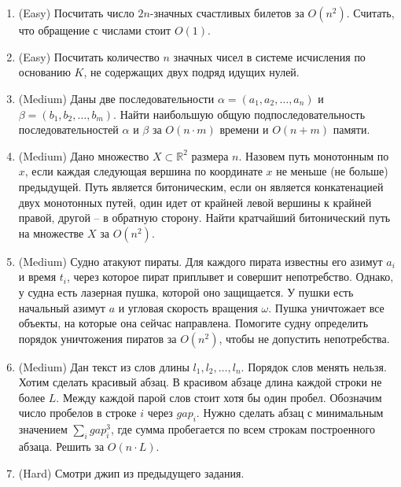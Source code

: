 \section{}

\begin{enumerate}

  \item (Easy) Посчитать число $2n$-значных счастливых билетов за $O(n^2)$.
  Считать, что обращение с числами стоит $O(1)$.

  \item (Easy) Посчитать количество $n$ значных чисел в системе исчисления
  по основанию $K$, не содержащих двух подряд идущих нулей.

  \item (Medium) Даны две последовательности $\alpha = (a_1, a_2, \dots, a_n)$ 
  и $\beta = (b_1, b_2, \dots, b_m)$. Найти наибольшую общую подпоследовательность
  последовательностей $\alpha$ и $\beta$ за $O(n \cdot m)$ времени и $O(n + m)$ 
  памяти.

  \item (Medium) Дано множество $X \subset \mathbb{R}^2$ размера $n$.
  Назовем путь монотонным по $x$, если каждая следующая вершина 
  по координате $x$ не меньше (не больше) предыдущей. Путь является битоническим,
  если он является конкатенацией двух монотонных путей, один идет от крайней левой 
  вершины к крайней правой, другой -- в обратную сторону. Найти кратчайший 
  битонический путь на множестве $X$ за $O(n^2)$.

  \item (Medium) Судно атакуют пираты. Для каждого пирата известны
  его азимут $a_i$ и время $t_i$, через которое пират приплывет и
  совершит непотребство. Однако, у судна есть лазерная пушка, которой 
  оно защищается. У пушки есть начальный азимут $a$ и угловая скорость
  вращения $\omega$. Пушка уничтожает все объекты, на которые она сейчас
  направлена. Помогите судну определить порядок уничтожения пиратов за $O(n^2)$,
  чтобы не допустить непотребства.

  \item (Medium) Дан текст из слов длины $l_1, l_2, \dots, l_n$. Порядок
  слов менять нельзя. Хотим сделать красивый абзац. В красивом абзаце 
  длина каждой строки не более $L$. Между каждой парой слов стоит хотя бы
  один пробел. Обозначим число пробелов в строке $i$ через $gap_i$. Нужно
  сделать абзац с минимальным значением $\sum_i gap_i^3$, где сумма
  пробегается по всем строкам построенного абзаца. Решить за $O(n \cdot L)$.

  \item (Hard) Смотри джип из предыдущего задания.

\end{enumerate}
